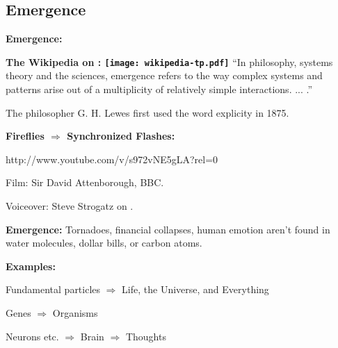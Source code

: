 \begin{frame}[plain]
\begin{frame}[plain]
\subsection{Emergence}

  \textbf{Emergence:}

  \textbf{The Wikipedia on :
      \hfill
      \texttt{[image: wikipedia-tp.pdf]}
    }
    ``In philosophy, systems theory and the sciences, emergence refers to
    the way complex systems and patterns arise out of a multiplicity of
    relatively simple interactions. 
    {... .''}
  


    The philosopher G. H. Lewes first
    used the word explicity in 1875.




  \textbf{Fireflies $\Rightarrow$ Synchronized Flashes:}

  {http://www.youtube.com/v/s972vNE5gLA?rel=0}

  \small

  Film: Sir David Attenborough, BBC.

  Voiceover: Steve Strogatz on 
  .



  \textbf{Emergence:}
    Tornadoes, financial collapses, human emotion aren't
    found in water molecules, dollar bills, or carbon atoms.
  

  \textbf{Examples:}
    
     
      Fundamental particles $\Rightarrow$ Life, the Universe, and Everything
     
      Genes $\Rightarrow$ Organisms
    
      Neurons etc. $\Rightarrow$ Brain $\Rightarrow$ Thoughts
     

\end{frame}
\end{frame}
